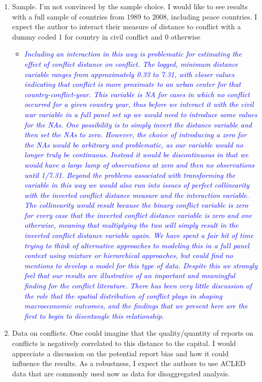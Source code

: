 \begin{enumerate}
\item Sample. I’m not convinced by the sample choice. I would like to see results with a full sample of countries from 1989 to 2008, including peace countries. I expect the author to interact their measure of distance to conflict with a dummy coded 1 for country in civil conflict and 0 otherwise

\begin{itemize}
\item \textcolor{blue}{\emph{
	Including an interaction in this way is problematic for estimating the effect of conflict distance on conflict. The logged, minimum distance variable ranges from approximately 0.33 to 7.31, with closer values indicating that conflict is more proximate to an urban center for that country-conflict-year. This variable is NA for cases in which no conflict occurred for a given country year, thus before we interact it with the civil war variable in a full panel set up we would need to introduce some values for the NAs. One possibility is to simply invert the distance variable and then set the NAs to zero. However, the choice of introducing a zero for the NAs would be arbitrary and problematic, as our variable would no longer truly be continuous. Instead it would be discontinuous in that we would have a large lump of observations at zero and then no observations until 1/7.31. Beyond the problems associated with transforming the variable in this way we would also run into issues of perfect collinearity with the inverted conflict distance measure and the interaction variable. The collinearity would result because the binary conflict variable is zero for every case that the inverted conflict distance variable is zero and one otherwise, meaning that multiplying the two will simply result in the inverted conflict distance variable again. 
	We have spent a fair bit of time trying to think of alternative approaches to modeling this in a full panel context using mixture or hierarchical approaches, but could find no mentions to develop a model for this type of data. 
	Despite this we strongly feel that our results are illustrative of an important and meaningful finding for the conflict literature. There has been very little discussion of the role that the spatial distribution of conflict plays in shaping macroeconomic outcomes, and the findings that we present here are the first to begin to disentangle this relationship.
}}
\end{itemize}

\item Data on conflicts. One could imagine that the quality/quantity of reports on conflicts is negatively correlated to this distance to the capital. I would appreciate a discussion on the potential report bias and how it could influence the results. As a robustness, I expect the authors to use ACLED data that are commonly used now as data for disaggregated analysis.


\end{enumerate}

